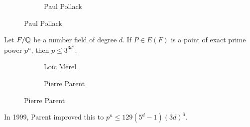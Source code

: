 \begin{frame}[plain]
\begin{figure}[h]
\begin{subfigure}{0.3\textwidth}
	\caption{Paul Pollack}
	\end{subfigure}
	\end{figure}
\end{frame}


\begin{frame}[plain]
\begin{thm}[Merel, 1996]
Let $F/\mathbb{Q}$ be a number field of degree $d$. If $P \in E(F)$ is a point of exact prime power $p^n$, then $p \leq 3^{3d^2}$.
\end{thm} 
	\begin{figure}[h]
	\centering
	\begin{subfigure}{0.3\textwidth}
	\captionsetup{labelformat=empty}
	\centering
	\caption{Lo\"ic Merel}
	\end{subfigure}
	\begin{subfigure}{0.3\textwidth}
	\captionsetup{labelformat=empty}
	\centering
	\caption{Pierre Parent}
	\end{subfigure}
	\end{figure}
\begin{rem}
In 1999, Parent improved this to $p^n \leq 129(5^d - 1)(3d)^6$.
\end{rem}
\end{frame}


